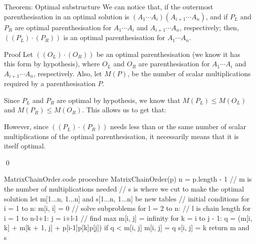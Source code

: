 \documentclass[a4paper]{article}
\begin{document}
\begin{parag}{Theorem: Optimal substructure}
    We can notice that, if the outermost parenthesisation in an optimal solution is $\left(A_1 \cdots A_i\right)\left(A_{i+1} \cdots A_n\right)$, and if $P_L$ and $P_R$ are optimal parenthesisation for $A_1 \cdots A_i$ and $A_{i+1} \cdots A_n$, respectively; then, $\left(\left(P_L\right) \cdot \left(P_R\right)\right)$ is an optimal parenthesisation for $A_1 \cdots A_n$.

    \begin{subparag}{Proof}
        Let $\left(\left(O_L\right) \cdot \left(O_R\right)\right)$ be an optimal parenthesisation (we know it has this form by hypothesis), where $O_L$ and $O_R$ are parenthesisation for $A_1 \cdots A_i$ and $A_{i+1} \cdots A_n$, respectively. Also, let $M\left(P\right)$, be the number of scalar multiplications required by a parenthesisation $P$.

        Since $P_L$ and $P_R$ are optimal by hypothesis, we know that $M\left(P_L\right) \leq M\left(O_L\right)$ and $M\left(P_R\right) \leq M\left(O_R\right)$. This allows us to get that:

        However, since $\left(\left(P_L\right) \cdot \left(P_R\right)\right)$ needs less than or the same number of scalar multiplications of the optimal parenthesisation, it necessarily means that it is itself optimal.

        \qed
    \end{subparag}
    
\end{parag}

\begin{filecontents*}[overwrite]{MatrixChainOrder.code}
procedure MatrixChainOrder(p)
    n = p.length - 1
    // m is the number of multiplications needed
    // s is where we cut to make the optimal solution
    let m[1...n, 1...n] and s[1...n, 1...n] be new tables
    // initial conditions
    for i = 1 to n:
        m[i, i] = 0
    // solve subproblems
    for l = 2 to n:  // l is chain length
        for i = 1 to n-l+1:
            j = i+l-1
            // find max
            m[i, j] = infinity
            for k = i to j - 1:
                q = (m[i, k] + m[k + 1, j] 
                     + p[i-1]p[k]p[j])
                if q < m[i, j]
                    m[i, j] = q
                    s[i, j] = k
    return m and s
\end{filecontents*}
\end{document}
